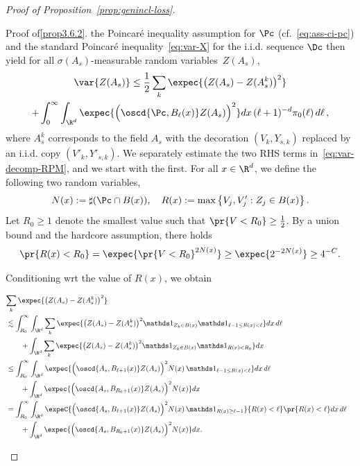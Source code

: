 \begin{proof}[Proof of Proposition~\ref{prop:genincl-loss}]
\begin{step}{Proof of\eqref{prop3.6.2}.}
\goodbreak
\noindent the Poincaré inequality assumption for $\Pc$ (cf.~\eqref{eq:ass-ci-pc}) and the standard Poincaré inequality~\eqref{eq:var-X} for the i.i.d. sequence $\Dc$ then yield for all $\sigma(A_s)$-measurable random variables~$Z(A_s)$,
\begin{multline}\label{eq:var-decomp-RPM}
\var{Z(A_s)}\le \frac12\sum_{k}\expec{\big(Z(A_s)-Z(A_s^k)\big)^2}\\
+\int_0^\infty\int_{\R^d}\expec{\Big(\oscd{\Pc,B_{\ell}(x)}Z(A_s)\Big)^2}dx\,(\ell+1)^{-d}\pi_0(\ell)\,d\ell\,,
\end{multline}
where $A^k_s$ corresponds to the field $A_s$ with the decoration $(V_k,Y_{s,k})$ replaced by an i.i.d. copy $(V'_k,Y'_{s,k})$. We separately estimate the two RHS terms in~\eqref{eq:var-decomp-RPM}, and we start with the first. For all $x\in\R^d$, we define the following two random variables,
\begin{align*}
N(x):=\sharp(\Pc\cap B(x)),\quad R(x):=\max\left\{V_j,V_j':Z_j\in B(x)\right\}.
\end{align*}
Let $R_0\ge1$ denote the smallest value such that $\pr{V<R_0}\ge\frac12$. By a union bound and the hardcore assumption, there holds
\begin{align}\label{eq:choice-R0-SGRPM}
\pr{R(x)<R_0}=\expec{\pr{V<R_0}^{2N(x)}}\ge \expec{2^{-2N(x)}}\ge 4^{-C}.
\end{align}


Conditioning wrt the value of $R(x)$, we obtain


\begin{align*}
\lefteqn{\sum_{k}\expec{\big(Z(A_s)-Z(A_s^k)\big)^2}}\\
&\lesssim\int_{R_0}^\infty\int_{\R^d}\sum_{k}\expec{\big(Z(A_s)-Z(A_s^k)\big)^2\mathds1_{Z_k\in B(x)}\mathds1_{\ell-1\le R(x)<\ell}}dx\,d\ell\\
&\qquad+\int_{\R^d}\sum_{k}\expec{\big(Z(A_s)-Z(A_s^k)\big)^2\mathds1_{Z_k\in B(x)}\mathds1_{R(x)<R_0}}dx\\
&\le\int_{R_0}^\infty\int_{\R^d}\expec{\Big(\oscd{A_s,B_{\ell+1}(x)}Z(A_s)\Big)^2N(x)\,\mathds1_{\ell-1\le R(x)<\ell}}dx\,d\ell\\
&\qquad+\int_{\R^d}\expec{\Big(\oscd{A_s,B_{R_0+1}(x)}Z(A_s)\Big)^2N(x)}dx\\
&=\int_{R_0}^\infty\int_{\R^d}\expeC{\Big(\oscd{A_s,B_{\ell+1}(x)}Z(A_s)\Big)^2N(x)\,\mathds1_{R(x)\ge\ell-1}}{R(x)<\ell}\pr{R(x)<\ell}dx\,d\ell\\
&\qquad+\int_{\R^d}\expec{\Big(\oscd{A_s,B_{R_0+1}(x)}Z(A_s)\Big)^2N(x)}dx.
\end{align*}


\end{step}
\end{proof}
